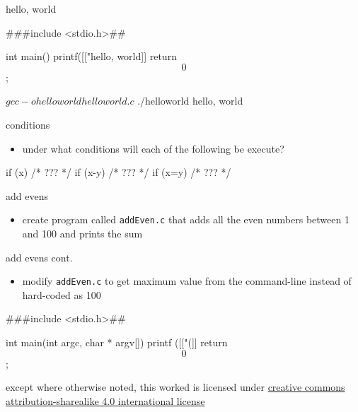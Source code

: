 \documentclass[10pt,t,usenames,dvipsnames]{beamer}
\begin{document}
  \begin{frame}[fragile]{hello, world}
    \begin{codeblock}
      ###include <stdio.h>##

      int main()
      {
        printf([["hello, world]]%
        return $$0$$;
      }
    \end{codeblock}

    \begin{termblock}
      $ gcc -o helloworld helloworld.c
      $ ./helloworld
      hello, world
    \end{termblock}
  \end{frame}

  \begin{frame}[fragile]{conditions}
    \begin{itemize}
      \item under what conditions will each of the following be execute?
    \end{itemize}
    \begin{codeblock}
      if (x) {
        /* ??? */
      }
      if (x-y) {
        /* ??? */
      }
      if (x=y) {
        /* ??? */
      }
    \end{codeblock}
  \end{frame}

  \begin{frame}{add evens}
    \begin{itemize}
      \item create program called \texttt{addEven.c} that adds all the even
        numbers between 1 and 100 and prints the sum
    \end{itemize}
  \end{frame}

  \begin{frame}[fragile]{add evens cont.}
    \begin{itemize}
      \item modify \texttt{addEven.c} to get maximum value from the command-line
        instead of hard-coded as 100
    \end{itemize}

    \begin{codeblock}
      ###include <stdio.h>##

      int main(int argc, char * argv[])
      {
        printf ([["(]]%
        return $$0$$;
      } 
    \end{codeblock}
  \end{frame}

  \appendix

  \begin{frame}[c]
    \begin{center}\ccbysa\end{center}

    except where otherwise noted, this worked is licensed under
    \href{http://creativecommons.org/licenses/by-sa/4.0/}{creative commons
    attribution-sharealike 4.0 international license}
  \end{frame}
\end{document}
